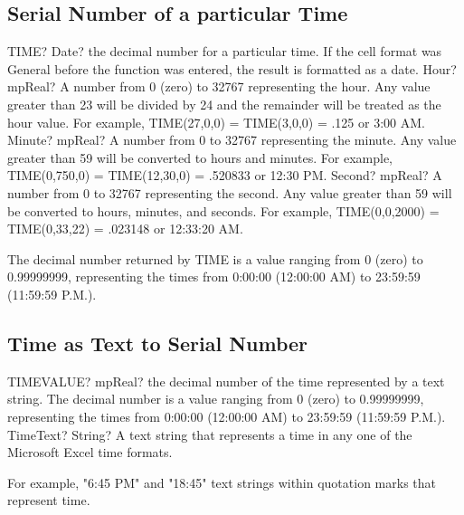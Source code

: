 \subsection{Serial Number of a particular Time}

\begin{mpFunctionsExtract}
	\mpWorksheetFunctionThreeNotImplemented
	{TIME? Date? the decimal number for a particular time. If the cell format was General before the function was entered, the result is formatted as a date.}
	{Hour? mpReal? A number from 0 (zero) to 32767 representing the hour. Any value greater than 23 will be divided by 24 and the remainder will be treated as the hour value. For example, TIME(27,0,0) = TIME(3,0,0) = .125 or 3:00 AM.}
	{Minute? mpReal? A number from 0 to 32767 representing the minute. Any value greater than 59 will be converted to hours and minutes. For example, TIME(0,750,0) = TIME(12,30,0) = .520833 or 12:30 PM.}
	{Second? mpReal? A number from 0 to 32767 representing the second. Any value greater than 59 will be converted to hours, minutes, and seconds. For example, TIME(0,0,2000) = TIME(0,33,22) = .023148 or 12:33:20 AM.}
\end{mpFunctionsExtract}

\vspace{0.3cm}
The decimal number returned by TIME is a value ranging from 0 (zero) to 0.99999999, representing the times from 0:00:00 (12:00:00 AM) to 23:59:59 (11:59:59 P.M.).






\subsection{Time as Text to Serial Number}

\begin{mpFunctionsExtract}
	\mpWorksheetFunctionOneNotImplemented
	{TIMEVALUE? mpReal? the decimal number of the time represented by a text string. The decimal number is a value ranging from 0 (zero) to 0.99999999, representing the times from 0:00:00 (12:00:00 AM) to 23:59:59 (11:59:59 P.M.).}
	{TimeText? String? A text string that represents a time in any one of the Microsoft Excel time formats.}
\end{mpFunctionsExtract}

\vspace{0.3cm}

For example, "6:45 PM" and "18:45" text strings within quotation marks that represent time.




